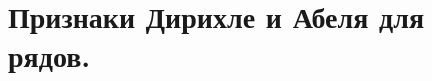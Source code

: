 \documentclass[../main.tex]{subfiles}
\begin{document}
\newpage
\section{Признаки Дирихле и Абеля для рядов.}
\end{document}
